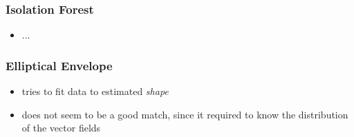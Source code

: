 	\subsubsection{Isolation Forest}
		\begin{itemize}
			\item ...
		\end{itemize}
	
	\subsubsection{Elliptical Envelope}
		\begin{itemize}
			\item tries to fit data to estimated \emph{shape}
			\item does not seem to be a good match, since it required to know the distribution of the vector fields
		\end{itemize}